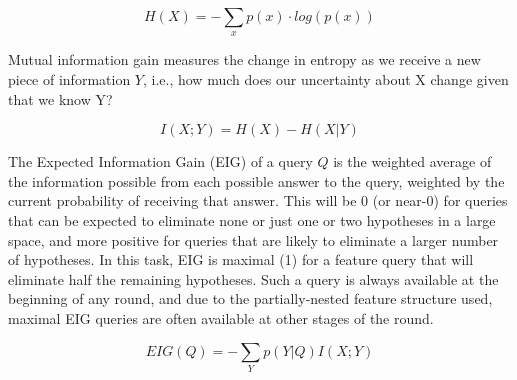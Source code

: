 \documentclass[10pt,letterpaper]{article}
\begin{document}
\begin{equation}
  H(X) = -\sum_{x} p(x) \cdot log(p(x))
\end{equation}

Mutual information gain measures the change in entropy as we receive a new piece of information $Y$, i.e., how much does our uncertainty about X change given that we know Y?

\begin{equation}
  I(X;Y) = H(X) - H(X|Y)
\end{equation}

The Expected Information Gain (EIG) of a query $Q$ is the weighted average of the information possible from each possible answer to the query, weighted by the current probability of receiving that answer. This will be 0 (or near-0) for queries that can be expected to eliminate none or just one or two hypotheses in a large space, and more positive for queries that are likely to eliminate a larger number of hypotheses. In this task, EIG is maximal (1) for a feature query that will eliminate half the remaining hypotheses. Such a query is always available at the beginning of any round, and due to the partially-nested feature structure used, maximal EIG queries are often available at other stages of the round.

\begin{equation}
  EIG(Q) = -\sum_{Y} p(Y|Q) I(X;Y)
\end{equation}
\end{document}
